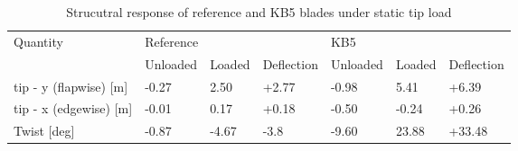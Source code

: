 \begin{table}[pth]
\centering
\caption{Strucutral response of reference and KB5 blades under static tip load}
\label{tab:static_load_test}
\begin{tabular}{|l|l|l|l|l|l|l|}
\hline
\multirow{2}{*}{Quantity}  & \multicolumn{3}{l|}{Reference} & \multicolumn{3}{l|}{KB5}       \\ \cline{2-7} 
                           & Unloaded & Loaded & Deflection & Unloaded & Loaded & Deflection \\ \hline
tip - y (flapwise) {[}m{]} & -0.27    & 2.50   & +2.77      & -0.98    & 5.41   & +6.39      \\
tip - x (edgewise) {[}m{]} & -0.01    & 0.17   & +0.18      & -0.50    & -0.24  & +0.26      \\
Twist {[}deg{]}            & -0.87    & -4.67  & -3.8       & -9.60    & 23.88  & +33.48      \\ \hline
\end{tabular}
\end{table}